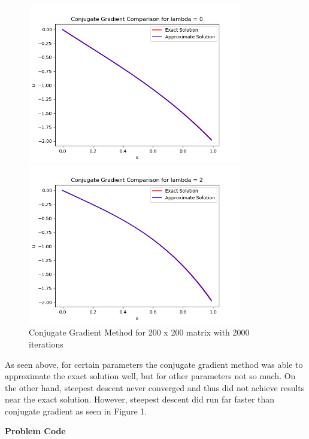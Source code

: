 \documentclass{article}
\newcommand{\Problem}[1]{\textbf{\large Problem #1}}
\begin{document}
\begin{figure}[H]
\centering
\caption{Conjugate Gradient Method for 200 x 200 matrix with 2000 iterations}
\begin{minipage}[b]{0.4\textwidth}
\includegraphics[height=7cm]{goodcg0}	
\end{minipage}
\hspace{0.6in}
\begin{minipage}[b]{0.4\textwidth}
\centering
\includegraphics[height=7cm]{goodcg2}	
\end{minipage}
\end{figure}

As seen above, for certain parameters the conjugate gradient method was able to approximate the exact solution well, but for other parameters not so much. 
On the other hand, steepest descent never converged and thus did not achieve results near the exact solution. 
However, steepest descent did run far faster than conjugate gradient as seen in Figure 1. 

\Problem{Code}



\end{document}
